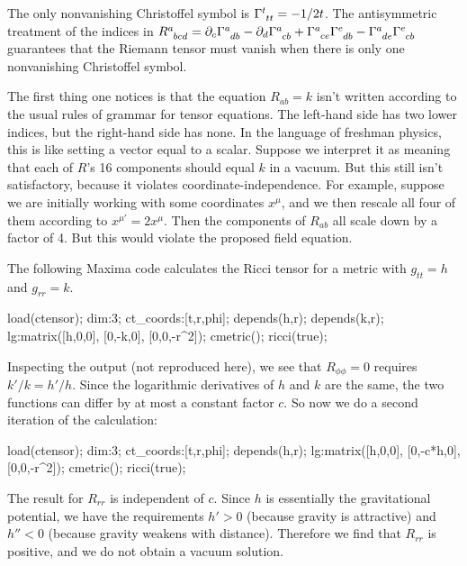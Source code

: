 The only nonvanishing Christoffel symbol is $\Gamma\indices{^t_{tt}}=-1/2t$. The antisymmetric
treatment of the indices in $R\indices{^a_{bcd}} = \partial_c \Gamma\indices{^a_{db}} - \partial_d \Gamma\indices{^a_{cb}}
                        + \Gamma\indices{^a_{ce}}\Gamma\indices{^e_{db}}-\Gamma\indices{^a_{de}}\Gamma\indices{^e_{cb}}$
guarantees that the Riemann tensor must vanish when there is only one nonvanishing Christoffel symbol.

The first thing one notices is that the equation $R_{ab}=k$ isn't written according to the usual rules of grammar
for tensor equations. The left-hand side has two lower indices, but the right-hand side has none. In the language of freshman physics,
this is like setting a vector equal to a scalar. Suppose we interpret it as meaning that each of $R$'s 16 components should equal
$k$ in a vacuum. But this still isn't satisfactory, because it violates coordinate-independence. For example, suppose we
are initially working with some coordinates $x^\mu$, and we then rescale all four of them according to $x^{\mu'}=2x^\mu$.
Then the components of $R_{ab}$ all scale down by a factor of 4. But this would violate the proposed field equation.

The following Maxima code calculates the Ricci tensor for a metric with $g_{tt}=h$ and $g_{rr}=k$.

\begin{listing}{1}
load(ctensor);
dim:3;
ct_coords:[t,r,phi];
depends(h,r);
depends(k,r);
lg:matrix([h,0,0],
          [0,-k,0],
          [0,0,-r^2]);
cmetric();
ricci(true);
\end{listing}

\noindent Inspecting the output (not reproduced here), we see that $R_{\phi\phi}=0$ requires $k'/k=h'/h$. Since the logarithmic derivatives of $h$ and $k$ are the
same, the two functions can differ by at most a constant factor $c$. So now we do a second iteration of the calculation:

\begin{listing}{1}
load(ctensor);
dim:3;
ct_coords:[t,r,phi];
depends(h,r);
lg:matrix([h,0,0],
          [0,-c*h,0],
          [0,0,-r^2]);
cmetric();
ricci(true);
\end{listing}

\noindent The result for $R_{rr}$ is independent of $c$. Since $h$ is essentially the gravitational potential,
we have the requirements $h'>0$ (because gravity is attractive)
and $h''<0$ (because gravity weakens with distance). Therefore we find that  $R_{rr}$
is positive, and we do not obtain a vacuum solution.

